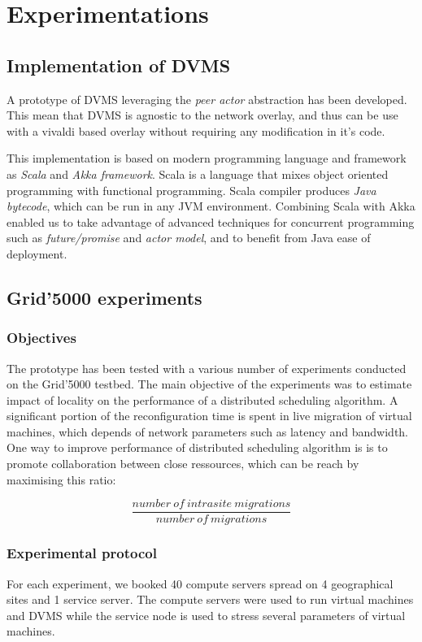 \section{Experimentations}

\subsection{Implementation of DVMS}

A prototype of DVMS leveraging the \emph{peer actor} abstraction has been 
developed. This mean that DVMS is agnostic to the network overlay, and thus can
be use with a vivaldi based overlay without requiring any modification in it's 
code.

This implementation is based on modern programming language and framework as 
\emph{Scala} and \emph{Akka framework}. Scala is a language that mixes object
oriented programming with functional programming. Scala compiler produces 
\emph{Java bytecode}, which can be run in any JVM environment. Combining Scala 
with Akka enabled us to take advantage of advanced techniques for concurrent 
programming such as \emph{future/promise} and \emph{actor model}, and to benefit
from Java ease of deployment.



\subsection{Grid'5000 experiments}


\subsubsection{Objectives}
The prototype has been tested with a various number of experiments conducted on
the Grid'5000 testbed. The main objective of the experiments was to estimate
impact of locality on the performance of a distributed scheduling algorithm. 
A significant portion of the reconfiguration time is spent in live migration of
virtual machines, which depends of network parameters such as latency and
bandwidth. One way to improve performance of distributed scheduling algorithm is
is to promote collaboration between close ressources, which can be reach by 
maximising this ratio:

\[
	\frac{number\ of\ intrasite\ migrations}{number\ of\ migrations}
\]

\subsubsection{Experimental protocol}
For each experiment, we booked 40 compute servers spread on 4 geographical sites
and 1 service server. The compute servers were used to run virtual machines and
DVMS while the service node is used to stress several parameters of 
virtual machines.

